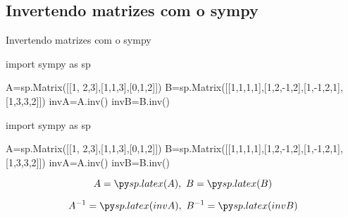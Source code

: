 \subsection*{Invertendo matrizes com o sympy}

\begin{frame}[label=inversao,fragile=singleslide]{Invertendo matrizes com o sympy}
	\begin{footnotesize}
\begin{pyverbatim}
import sympy as sp

A=sp.Matrix([[1, 2,3],[1,1,3],[0,1,2]])
B=sp.Matrix([[1,1,1,1],[1,2,-1,2],[1,-1,2,1],[1,3,3,2]])
invA=A.inv()
invB=B.inv()
\end{pyverbatim}
	\end{footnotesize}		
\begin{pycode}
import sympy as sp

A=sp.Matrix([[1, 2,3],[1,1,3],[0,1,2]])
B=sp.Matrix([[1,1,1,1],[1,2,-1,2],[1,-1,2,1],[1,3,3,2]])
invA=A.inv()
invB=B.inv()
\end{pycode}
\[A=\pyl{A},\ B=\pyl{B}\]

\[A^{-1}=\pyl{invA},\ B^{-1}=\pyl{invB}\]
\end{frame}